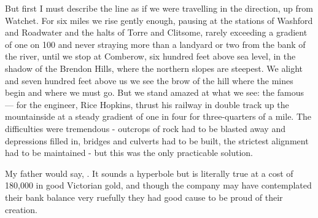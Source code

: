 But first I must describe the line as if we were travelling in the  direction, up from Watchet. For six miles we rise gently enough, pausing at the stations of Washford and Roadwater and the halts of Torre and Clitsome, rarely exceeding a gradient of one on 100 and never straying more than a landyard or two from the bank of the river, until we stop at Comberow, six hundred feet above sea level, in the shadow of the Brendon Hills, where the northern slopes are steepest. We alight and seven hundred feet above us we see the brow of the hill where the mines begin and where we must go. But we stand amazed at what we see: the famous  — for the engineer, Rice Hopkins, thrust his railway in double track up the mountainside at a steady gradient of one in four for three-quarters of a mile. The difficulties were tremendous - outcrops of rock had to be blasted away and depressions filled in, bridges and culverts had to be built, the strictest alignment had to be maintained - but this was the only practicable solution.

My father would say, . It sounds a hyperbole but is literally true at a cost of 180,000 in good Victorian gold, and though the company may have contemplated their bank balance very ruefully they had good cause to be proud of their creation.

